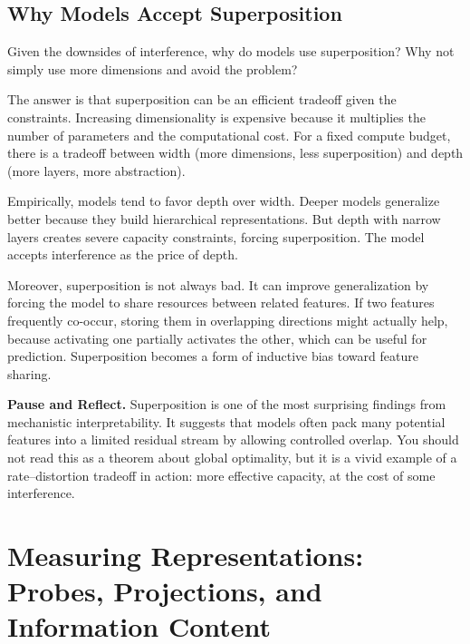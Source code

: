 \vspace{1.5em}

\subsection{Why Models Accept Superposition}

Given the downsides of interference, why do models use superposition? Why not simply use more dimensions and avoid the problem?

The answer is that superposition can be an efficient tradeoff given the constraints. Increasing dimensionality is expensive because it multiplies the number of parameters and the computational cost. For a fixed compute budget, there is a tradeoff between width (more dimensions, less superposition) and depth (more layers, more abstraction).

Empirically, models tend to favor depth over width. Deeper models generalize better because they build hierarchical representations. But depth with narrow layers creates severe capacity constraints, forcing superposition. The model accepts interference as the price of depth.

Moreover, superposition is not always bad. It can improve generalization by forcing the model to share resources between related features. If two features frequently co-occur, storing them in overlapping directions might actually help, because activating one partially activates the other, which can be useful for prediction. Superposition becomes a form of inductive bias toward feature sharing.

\vspace{1.5em}

\begin{pausebox}
\textbf{Pause and Reflect.} Superposition is one of the most surprising findings from mechanistic interpretability. It suggests that models often pack many potential features into a limited residual stream by allowing controlled overlap. You should not read this as a theorem about global optimality, but it is a vivid example of a rate--distortion tradeoff in action: more effective capacity, at the cost of some interference.
\end{pausebox}

\vspace{2em}

\section{Measuring Representations: Probes, Projections, and Information Content}
\label{sec:measuring_representations}

